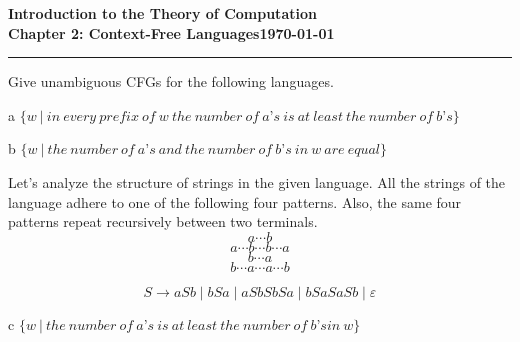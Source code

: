 \documentclass[11pt]{article}
\newcommand{\dated}{\today}
\begin{document}
\textbf{Introduction to the Theory of
Computation}\hfill\textbf{\myname}\\[0.01in]
\textbf{Chapter 2: Context-Free Languages}\hfill\textbf{\dated}\\
\smallskip\hrule\bigskip

\begin{problem}{2.30}
Give unambiguous CFGs for the following languages.
\end{problem}

\begin{problem}[Part]{a}
$\{w \ | \ in \ every \ prefix \ of \ w \ the \ number \ of \ a’s \ is \ at \ least \ the \ number \ of \ b’s \}$
\end{problem}

\begin{problem}[Part]{b}
$\{w \ | \ the \ number \ of \ a’s \ and \ the \ number \ of \ b’s \ in \ w \ are \ equal\}$
\end{problem}

\begin{idea}
Let's analyze the structure of strings in the given language. All the strings of the language adhere to one of the following four patterns. Also, the same four patterns repeat recursively between two terminals.
\[ a \cdots b \]
\[ a \cdots b \cdots b \cdots a \]
\[ b \cdots a \]
\[ b \cdots a \cdots a \cdots b \]
\end{idea}

\begin{solution}
\[
S \rightarrow aSb \mid bSa \mid aSbSbSa \mid bSaSaSb \mid \varepsilon
\]
\end{solution}

\begin{problem}[Part]{c}
$\{w \ | \ the \ number \ of \ a’s \ is \ at \ least \ the \ number \ of \ b’s in \ w\}$
\end{problem}
\end{document}
